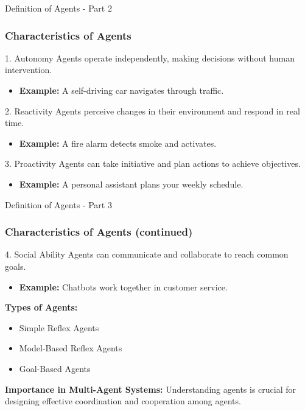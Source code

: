 \documentclass[aspectratio=169]{beamer}
\begin{document}
\begin{frame}[fragile]{Definition of Agents - Part 2}
    \frametitle{Characteristics of Agents}
    \begin{block}{1. Autonomy}
        Agents operate independently, making decisions without human intervention.
        \begin{itemize}
            \item \textbf{Example:} A self-driving car navigates through traffic.
        \end{itemize}
    \end{block}

    \begin{block}{2. Reactivity}
        Agents perceive changes in their environment and respond in real time.
        \begin{itemize}
            \item \textbf{Example:} A fire alarm detects smoke and activates.
        \end{itemize}
    \end{block}

    \begin{block}{3. Proactivity}
        Agents can take initiative and plan actions to achieve objectives.
        \begin{itemize}
            \item \textbf{Example:} A personal assistant plans your weekly schedule.
        \end{itemize}
    \end{block}
\end{frame}

\begin{frame}[fragile]{Definition of Agents - Part 3}
    \frametitle{Characteristics of Agents (continued)}
    \begin{block}{4. Social Ability}
        Agents can communicate and collaborate to reach common goals.
        \begin{itemize}
            \item \textbf{Example:} Chatbots work together in customer service.
        \end{itemize}
    \end{block}

    \vspace{0.5cm} %
    
    \textbf{Types of Agents:}
    \begin{itemize}
        \item Simple Reflex Agents
        \item Model-Based Reflex Agents
        \item Goal-Based Agents
    \end{itemize}
    
    \textbf{Importance in Multi-Agent Systems:}
    Understanding agents is crucial for designing effective coordination and cooperation among agents.
\end{frame}
\end{document}
